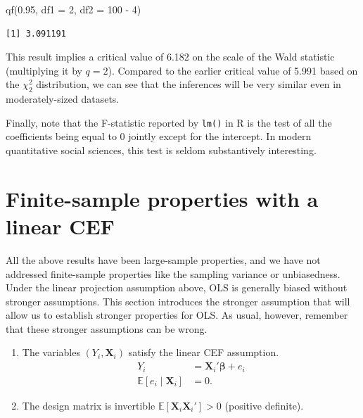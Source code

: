\documentclass[
  13pt,
  letterpaper,
  DIV=11,
  numbers=noendperiod]{scrreprt}
\newenvironment{Shaded}{\begin{snugshade}}{\end{snugshade}}
\newcommand{\AttributeTok}[1]{\textcolor[rgb]{0.40,0.45,0.13}{#1}}
\newcommand{\DecValTok}[1]{\textcolor[rgb]{0.68,0.00,0.00}{#1}}
\newcommand{\FloatTok}[1]{\textcolor[rgb]{0.68,0.00,0.00}{#1}}
\newcommand{\FunctionTok}[1]{\textcolor[rgb]{0.28,0.35,0.67}{#1}}
\newcommand{\NormalTok}[1]{\textcolor[rgb]{0.00,0.23,0.31}{#1}}
\newcommand{\SpecialCharTok}[1]{\textcolor[rgb]{0.37,0.37,0.37}{#1}}
\newcommand{\mb}{\symbf}
\newcommand{\E}{\mathbb{E}}
\newcommand{\X}{\mb{X}}
\newcommand{\bfbeta}{\mb{\beta}}
\theoremstyle{definition}
\theoremstyle{definition}
\theoremstyle{plain}
\theoremstyle{remark}
\begin{document}
\begin{Shaded}
\begin{Highlighting}[]
\FunctionTok{qf}\NormalTok{(}\FloatTok{0.95}\NormalTok{, }\AttributeTok{df1 =} \DecValTok{2}\NormalTok{, }\AttributeTok{df2 =} \DecValTok{100} \SpecialCharTok{{-}} \DecValTok{4}\NormalTok{)}
\end{Highlighting}
\end{Shaded}

\begin{verbatim}
[1] 3.091191
\end{verbatim}

This result implies a critical value of 6.182 on the scale of the Wald
statistic (multiplying it by \(q = 2\)). Compared to the earlier
critical value of 5.991 based on the \(\chi^2_2\) distribution, we can
see that the inferences will be very similar even in moderately-sized
datasets.

Finally, note that the F-statistic reported by \texttt{lm()} in R is the
test of all the coefficients being equal to 0 jointly except for the
intercept. In modern quantitative social sciences, this test is seldom
substantively interesting.

\section{Finite-sample properties with a linear
CEF}\label{finite-sample-properties-with-a-linear-cef}

All the above results have been large-sample properties, and we have not
addressed finite-sample properties like the sampling variance or
unbiasedness. Under the linear projection assumption above, OLS is
generally biased without stronger assumptions. This section introduces
the stronger assumption that will allow us to establish stronger
properties for OLS. As usual, however, remember that these stronger
assumptions can be wrong.

\begin{tcolorbox}[enhanced jigsaw, leftrule=.75mm, colbacktitle=quarto-callout-note-color!10!white, title=\textcolor{quarto-callout-note-color}{\faInfo}\hspace{0.5em}{Assumption: Linear Regression Model}, toptitle=1mm, breakable, left=2mm, toprule=.15mm, arc=.35mm, opacitybacktitle=0.6, opacityback=0, colback=white, rightrule=.15mm, titlerule=0mm, colframe=quarto-callout-note-color-frame, bottomtitle=1mm, bottomrule=.15mm, coltitle=black]

\begin{enumerate}
\def\labelenumi{\arabic{enumi}.}
\item
  The variables \((Y_{i}, \X_{i})\) satisfy the linear CEF assumption.
  \[ 
  \begin{aligned}
    Y_{i} &= \X_{i}'\bfbeta + e_{i} \\
    \E[e_{i}\mid \X_{i}] & = 0.
  \end{aligned}
  \]
\item
  The design matrix is invertible \(\E[\X_{i}\X_{i}'] > 0\) (positive
  definite).
\end{enumerate}

\end{tcolorbox}
\end{document}
